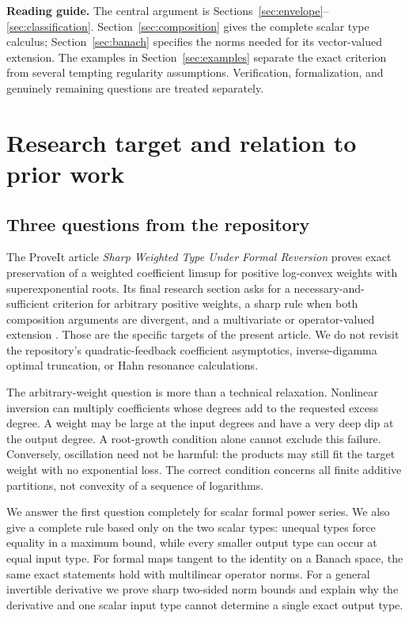 \documentclass[11pt,a4paper]{article}
\numberwithin{equation}{section}
\theoremstyle{definition}
\theoremstyle{remark}
\begin{document}
\hypersetup{pageanchor=true}
\setcounter{tocdepth}{1}
\tableofcontents
\vspace{7mm}
\noindent\textbf{Reading guide.}
The central argument is Sections~\ref{sec:envelope}--\ref{sec:classification}.
Section~\ref{sec:composition} gives the complete scalar type calculus;
Section~\ref{sec:banach} specifies the norms needed for its vector-valued
extension. The examples in Section~\ref{sec:examples} separate the exact
criterion from several tempting regularity assumptions. Verification,
formalization, and genuinely remaining questions are treated separately.
\clearpage

\section{Research target and relation to prior work}
\label{sec:context}

\subsection{Three questions from the repository}

The ProveIt article \emph{Sharp Weighted Type Under Formal Reversion}
proves exact preservation of a weighted coefficient limsup for positive
log-convex weights with superexponential roots. Its final research section
asks for a necessary-and-sufficient criterion for arbitrary positive
weights, a sharp rule when both composition arguments are divergent, and
a multivariate or operator-valued extension \cite{repo-weight}. Those are
the specific targets of the present article. We do not revisit the
repository's quadratic-feedback coefficient asymptotics, inverse-digamma
optimal truncation, or Hahn resonance calculations.

The arbitrary-weight question is more than a technical relaxation.
Nonlinear inversion can multiply coefficients whose degrees add to the
requested excess degree. A weight may be large at the input degrees and
have a very deep dip at the output degree. A root-growth condition alone
cannot exclude this failure. Conversely, oscillation need not be harmful:
the products may still fit the target weight with no exponential loss.
The correct condition concerns all finite additive partitions, not
convexity of a sequence of logarithms.

We answer the first question completely for scalar formal power series.
We also give a complete rule based only on the two scalar types: unequal
types force equality in a maximum bound, while every smaller output type
can occur at equal input type. For formal maps tangent to the identity on
a Banach space, the same exact statements hold with multilinear operator
norms. For a general invertible derivative we prove sharp two-sided norm
bounds and explain why the derivative and one scalar input type cannot
determine a single exact output type.
\end{document}
